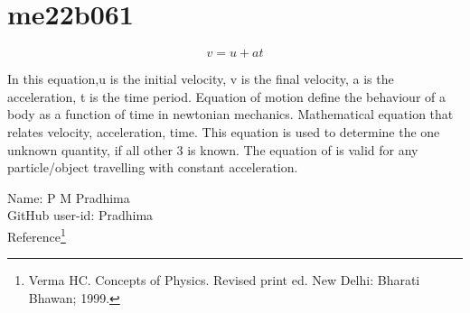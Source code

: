 \section*{me22b061}

\[ v = u + at \]

In this equation,u is the initial velocity, v is the final velocity, a is the acceleration, t is the time period.
Equation of motion define the behaviour of a body as a function of time in newtonian mechanics.
Mathematical equation that relates velocity, acceleration, time.
This equation is used to determine the one unknown quantity, if all other 3 is known.
The equation of is valid for any particle/object travelling with constant acceleration.

\vspace{41pt}

Name: P M Pradhima\\

GitHub user-id: Pradhima\\

Reference\footnote{Verma HC. Concepts of Physics. Revised print ed. New Delhi: Bharati Bhawan; 1999.}

